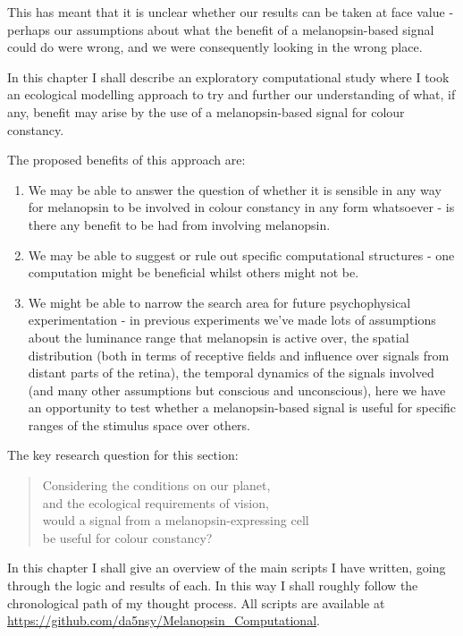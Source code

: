 This has meant that it is unclear whether our results can be taken at face value - perhaps our assumptions about what the benefit of a melanopsin-based signal could do were wrong, and we were consequently looking in the wrong place.

In this chapter I shall describe an exploratory computational study where I took an ecological modelling approach to try and further our understanding of what, if any, benefit may arise by the use of a melanopsin-based signal for colour constancy.

\noindent The proposed benefits of this approach are: 
\begin{enumerate}
    \item We may be able to answer the question of whether it is sensible in any way for melanopsin to be involved in colour constancy in any form whatsoever - is there any benefit to be had from involving melanopsin.
    \item We may be able to suggest or rule out specific computational structures - one computation might be beneficial whilst others might not be.
    \item We might be able to narrow the search area for future psychophysical experimentation - in previous experiments we've made lots of assumptions about the luminance range that melanopsin is active over, the spatial distribution (both in terms of receptive fields and influence over signals from distant parts of the retina), the temporal dynamics of the signals involved (and many other assumptions but conscious and unconscious), here we have an opportunity to test whether a melanopsin-based signal is useful for specific ranges of the stimulus space over others.
\end{enumerate}

\noindent The key research question for this section: %

\begin{quote}
Considering the conditions on our planet, \\
and the ecological requirements of vision, \\
would a signal from a melanopsin-expressing cell \\
be useful for colour constancy?
\end{quote}

In this chapter I shall give an overview of the main scripts I have written, going through the logic and results of each. In this way I shall roughly follow the chronological path of my thought process.
All scripts are available at \url{https://github.com/da5nsy/Melanopsin_Computational}.

